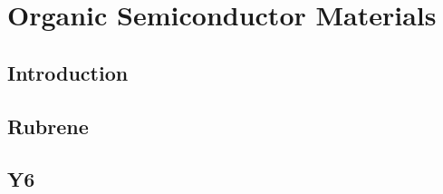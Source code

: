 
\chapter{Organic Semiconductor Materials} %

\label{Chapter2} %


\section{Introduction}

\section{Rubrene}

\section{Y6}
